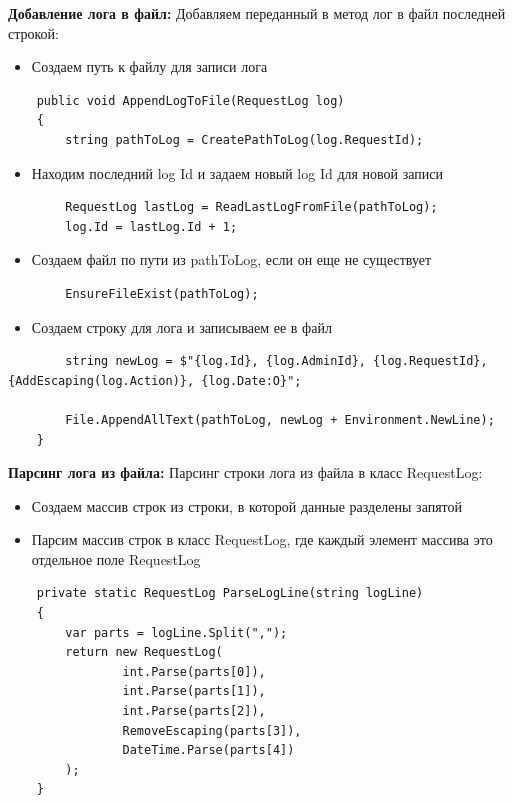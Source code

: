 \textbf{Добавление лога в файл:} Добавляем переданный в метод лог в файл последней строкой:
\begin{itemize}
	\item{Создаем путь к файлу для записи лога}
\end{itemize}
\begin{verbatim}
    public void AppendLogToFile(RequestLog log)
    {
        string pathToLog = CreatePathToLog(log.RequestId);
\end{verbatim}
\begin{itemize}
	\item{Находим последний log Id и задаем новый log Id для новой записи}
\end{itemize}
\begin{verbatim}
        RequestLog lastLog = ReadLastLogFromFile(pathToLog);
        log.Id = lastLog.Id + 1;
\end{verbatim}

\begin{itemize}
	\item{Создаем файл по пути из pathToLog, если он еще не существует}
\end{itemize}
\begin{verbatim}
        EnsureFileExist(pathToLog);
\end{verbatim}

\begin{itemize}
	\item{Создаем строку для лога и записываем ее в файл}
\end{itemize}
\begin{verbatim}
        string newLog = $"{log.Id}, {log.AdminId}, {log.RequestId}, {AddEscaping(log.Action)}, {log.Date:O}";

        File.AppendAllText(pathToLog, newLog + Environment.NewLine);
    }
\end{verbatim}

\textbf{Парсинг лога из файла:} Парсинг строки лога из файла в класс RequestLog:
\begin{itemize}
	\item{Создаем массив строк из строки, в которой данные разделены запятой}
	\item{Парсим массив строк в класс RequestLog, где каждый элемент массива это отдельное поле RequestLog}
\end{itemize}
\begin{verbatim}
    private static RequestLog ParseLogLine(string logLine)
    {
        var parts = logLine.Split(",");
        return new RequestLog(
                int.Parse(parts[0]),
                int.Parse(parts[1]),
                int.Parse(parts[2]),
                RemoveEscaping(parts[3]),
                DateTime.Parse(parts[4])
        );
    }
\end{verbatim}

